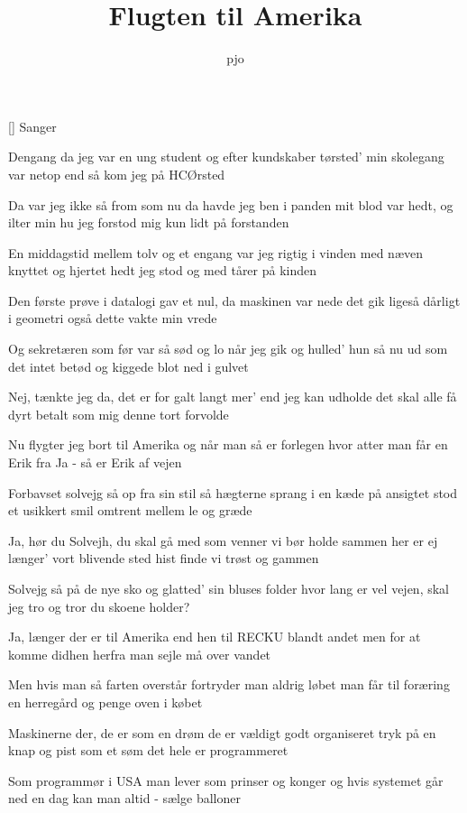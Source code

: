 \documentclass[a4paper,11pt]{article}
\title{Flugten til Amerika}
\author{pjo}
\begin{document}
\maketitle

\begin{roles}
[] Sanger
\end{roles}

\begin{song}
Dengang da jeg var en ung student
og efter kundskaber tørsted'
min skolegang var netop end
så kom jeg på HCØrsted

Da var jeg ikke så from som nu
da havde jeg ben i panden
mit blod var hedt, og ilter min hu
jeg forstod mig kun lidt på forstanden

En middagstid mellem tolv og et
engang var jeg rigtig i vinden
med næven knyttet og hjertet hedt
jeg stod og med tårer på kinden

Den første prøve i datalogi
gav et nul, da maskinen var nede
det gik ligeså dårligt i geometri
også dette vakte min vrede

Og sekretæren som før var så sød
og lo når jeg gik og hulled'
hun så nu ud som det intet betød
og kiggede blot ned i gulvet

Nej, tænkte jeg da, det er for galt
langt mer' end jeg kan udholde
det skal alle få dyrt betalt
som mig denne tort forvolde

Nu flygter jeg bort til Amerika
og når man så er forlegen
hvor atter man får en Erik fra
Ja - så er Erik af vejen

Forbavset solvejg så op fra sin stil
så hægterne sprang i en kæde
på ansigtet stod et usikkert smil
omtrent mellem le og græde

Ja, hør du Solvejh, du skal gå med
som venner vi bør holde sammen
her er ej længer' vort blivende sted
hist finde vi trøst og gammen

Solvejg så på de nye sko
og glatted' sin bluses folder
hvor lang er vel vejen, skal jeg tro
og tror du skoene holder?

Ja, længer der er til Amerika
end hen til RECKU blandt andet
men for at komme didhen herfra
man sejle må over vandet

Men hvis man så farten overstår
fortryder man aldrig løbet
man får til foræring en herregård
og penge oven i købet

Maskinerne der, de er som en drøm
de er vældigt godt organiseret
tryk på en knap og pist som et søm
det hele er programmeret

Som programmør i USA
man lever som prinser og konger
og hvis systemet går ned en dag
kan man altid - sælge balloner


\end{song}
\end{document}
